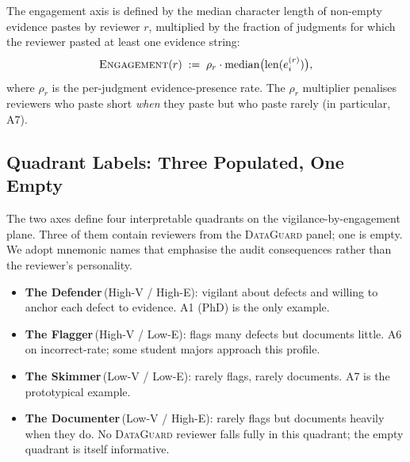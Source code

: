 \documentclass[11pt,a4paper]{article}
\newcommand{\dataguard}{\textsc{DataGuard}}
\newcommand{\Acc}[1]{\textsf{A#1}}
\begin{document}
The engagement axis is defined by the median character length of
non-empty evidence pastes by reviewer $r$, multiplied by the
fraction of judgments for which the reviewer pasted at least one
evidence string:
%
\[
\textsc{Engagement}(r) \;:=\;
\rho_r \cdot \mathrm{median}\big( \mathrm{len}(e^{(r)}_{i}) \big),
\]
%
where $\rho_r$ is the per-judgment evidence-presence rate. The
$\rho_r$ multiplier penalises reviewers who paste short \emph{when}
they paste but who paste rarely (in particular, \Acc{7}).

\subsection{Quadrant Labels: Three Populated, One Empty}
\label{sec:axis-styles}

The two axes define four interpretable quadrants on the
vigilance-by-engagement plane. Three of them contain reviewers from
the \dataguard{} panel; one is empty. We adopt mnemonic names that
emphasise the audit consequences rather than the reviewer's
personality.

\begin{itemize}[leftmargin=*,topsep=2pt]
\item \textbf{The Defender}\,(High-V / High-E): vigilant about
       defects and willing to anchor each defect to evidence.
       \Acc{1} (PhD) is the only example.
\item \textbf{The Flagger}\,(High-V / Low-E): flags many defects but
       documents little. \Acc{6} on incorrect-rate; some
       student majors approach this profile.
\item \textbf{The Skimmer}\,(Low-V / Low-E): rarely flags, rarely
       documents. \Acc{7} is the prototypical example.
\item \textbf{The Documenter}\,(Low-V / High-E): rarely flags but
       documents heavily when they do. No \dataguard{} reviewer falls
       fully in this quadrant; the empty quadrant is itself
       informative.
\end{itemize}
\end{document}
